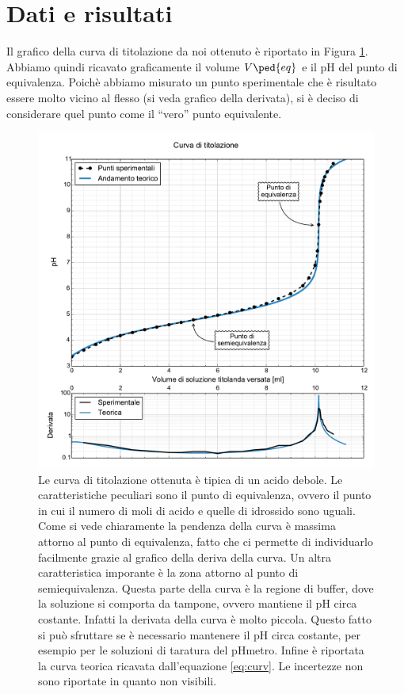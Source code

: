 \section*{Dati e risultati}

Il grafico della curva di titolazione da noi ottenuto è riportato in Figura \ref{fig:curva}. Abbiamo quindi ricavato
graficamente il volume $V\ped{eq}$ e il pH del punto di equivalenza. Poichè abbiamo misurato un punto sperimentale che è risultato
essere molto vicino al flesso (si veda grafico della derivata), si è deciso di considerare quel punto come il ``vero''
punto equivalente.

\begin{figure}
    \includegraphics[scale=0.55]{curva.pdf}
    \caption{Le curva di titolazione ottenuta è tipica di un acido debole. Le caratteristiche peculiari sono il punto di equivalenza,
        ovvero il punto in cui il numero di moli di acido e quelle di idrossido sono uguali. Come si vede chiaramente la
        pendenza della curva è massima attorno al punto di equivalenza, fatto che ci permette di individuarlo facilmente grazie al grafico
        della deriva della curva.
        Un altra caratteristica imporante è la zona attorno al punto di semiequivalenza. Questa parte della curva è la
        regione di buffer, dove la soluzione si comporta da tampone, ovvero mantiene il pH circa costante. Infatti la derivata della
        curva è molto piccola. Questo fatto si può sfruttare se è necessario mantenere il pH circa costante, per esempio per le soluzioni
        di taratura del pHmetro. Infine è riportata la curva teorica ricavata dall'equazione \eqref{eq:curv}. Le incertezze non sono riportate
        in quanto non visibili.}
    \label{fig:curva}
\end{figure}

